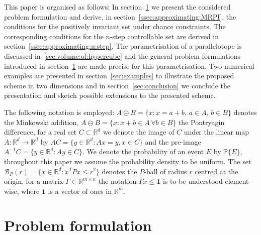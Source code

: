 \documentclass{ifacconf}
\providecommand{\B}{\mathcal B}
\providecommand{\PP}{\mathbb P}
\providecommand{\RR}{\mathbb R}
\providecommand{\bfa}[1]{\mathbf{#1}}
\begin{document}
%
This paper is organised  as follows:
In section~\ref{sec:setup} we present the considered problem formulation and derive, in section~\ref{ssec:approximating:MRPI}, the conditions for the positively invariant set under chance constraints. The corresponding conditions for the $n$-step controllable set are derived in section~\ref{ssec:approximating:n:step}.
%
The parametrisation of a parallelotope is discussed in~\ref{sec:volume:of:hypercube} and the general problem formulations introduced in section~\ref{sec:setup} are made precise for this parametrisation.
%
Two numerical examples are presented in section~\ref{sec:examples} to illustrate the proposed scheme in two dimensions and in section~\ref{sec:conclusion} we conclude the presentation and sketch possible extensions to the presented scheme.

The following notation is employed: $A\oplus B = \{x:x=a+b,\, a\in A,\, b\in B\}$ denotes the Minkowski addition, $A\ominus B = \{x: x+b \in A \, \forall b\in B\}$ the Pontryagin difference, for a real set $C\subset\RR^d$ we denote the image of $C$ under the linear map $A:\RR^d\rightarrow\RR^d$ by $AC = \{y\in\RR^d:Ax=y,x\in C\}$ and the pre-image $A^{-1}C = \{y\in\RR^d:Ay\in C\}$.
%
We denote the probability of an event $E$ by $\PP\{E\}$, throughout this paper we assume the probability density to be uniform.
%
The set $\B_P(r) = \{x\in\RR^d:x^TPx\leq r^2\}$ denotes the $P$-ball of radius $r$ centred at the origin, for a matrix $\Gamma\in\RR^{m\times n}$ the notation $\Gamma x\leq \bfa{1}$ is to be understood element-wise, where $\bfa{1}$ is a vector of ones in $\RR^m$.


\section{Problem formulation}\label{sec:setup}
%
\end{document}
